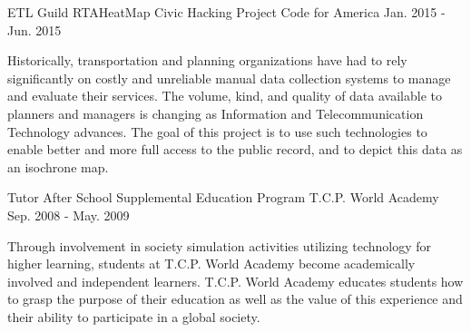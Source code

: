 \begin{cventries}
  \cventry
    {ETL Guild} %
    {RTAHeatMap Civic Hacking Project} %
    {Code for America} %
    {Jan. 2015 - Jun. 2015} %
    {
      \begin{cvcompactparagraph}
        Historically, transportation and planning organizations have had to rely significantly on costly and unreliable manual data collection systems to manage and evaluate their services. The volume, kind, and quality of data available to planners and managers is changing as Information and Telecommunication Technology advances. The goal of this project is to use such technologies to enable better and more full access to the public record, and to depict this data as an isochrone map.
      \end{cvcompactparagraph}
    }

  \cventry
    {Tutor} %
    {After School Supplemental Education Program} %
    {T.C.P. World Academy} %
    {Sep. 2008 - May. 2009} %
    {
      \begin{cvcompactparagraph}
        Through involvement in society simulation activities utilizing technology for higher learning, students at T.C.P. World Academy become academically involved and independent learners. T.C.P. World Academy educates students how to grasp the purpose of their education as well as the value of this experience and their ability to participate in a global society.
      \end{cvcompactparagraph}
    }

\end{cventries}
